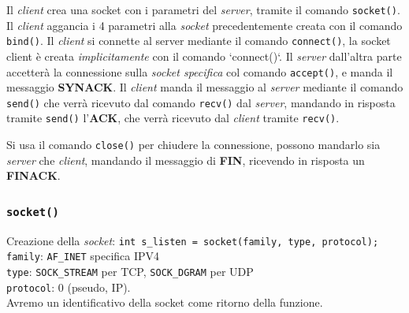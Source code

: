 Il \textit{client} crea una socket con i parametri del \textit{server}, tramite il comando \texttt{socket()}. Il \textit{client} aggancia i 4 parametri alla \textit{socket} precedentemente creata con il comando \texttt{bind()}. Il \textit{client} si connette al server mediante il comando \texttt{connect()}, la socket client è creata \textit{implicitamente} con il comando `connect()`. Il \textit{server} dall'altra parte accetterà la connessione sulla \textit{socket specifica} col comando \texttt{accept()}, e manda il messaggio \textbf{SYNACK}.
Il \textit{client} manda il messaggio al \textit{server} mediante il comando \texttt{send()} che verrà ricevuto dal comando \texttt{recv()} dal \textit{server}, mandando in risposta tramite \texttt{send()} l'\textbf{ACK}, che verrà ricevuto dal \textit{client} tramite \texttt{recv()}.

Si usa il comando \texttt{close()} per chiudere la connessione, possono mandarlo sia \textit{server} che \textit{client}, mandando il messaggio di \textbf{FIN}, ricevendo in risposta un \textbf{FINACK}.

\subsubsection*{\texttt{socket()}}
Creazione della \textit{socket}: \texttt{int s\_listen = socket(family, type, protocol);} \\
\texttt{family}: \texttt{AF\_INET} specifica IPV4 \\ \texttt{type}: \texttt{SOCK\_STREAM} per TCP, \texttt{SOCK\_DGRAM} per UDP \\ \texttt{protocol}: 0 (pseudo, IP). \\
Avremo un identificativo della socket come ritorno della funzione.

